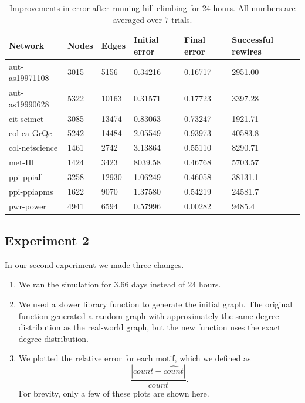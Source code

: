 \begin{table}[t]
\centering
\begin{tabular}{| l | l | l | | l | l | l |}
\hline
Network & Nodes & Edges & Initial error & Final error & Successful rewires\\ \hline
aut-as19971108 & 3015 & 5156 & 0.34216 & 0.16717 & 2951.00\\\hline
aut-as19990628 & 5322 & 10163 & 0.31571 & 0.17723 & 3397.28\\\hline
cit-scimet & 3085 & 13474 & 0.83063 & 0.73247 & 1921.71\\\hline
col-ca-GrQc & 5242 & 14484 & 2.05549 & 0.93973 & 40583.8\\\hline
col-netscience & 1461 & 2742 & 3.13864 & 0.55110 & 8290.71\\\hline
met-HI & 1424 & 3423 & 8039.58 & 0.46768 & 5703.57\\\hline
ppi-ppiall & 3258 & 12930 & 1.06249 & 0.46058 & 38131.1\\\hline
ppi-ppiapms & 1622 & 9070 & 1.37580 & 0.54219 & 24581.7\\\hline
pwr-power & 4941 & 6594 & 0.57996 & 0.00282 & 9485.4\\\hline
\end{tabular}
\caption{Improvements in error after running hill climbing for 24 hours.  All numbers are averaged over $7$ trials.}
\label{table:errors}
\end{table}

\subsection{Experiment 2}

In our second experiment we made three changes.

\begin{enumerate}
\item We ran the simulation for 3.66 days instead of 24 hours.
\item We used a slower library function to generate the initial graph.  
The original function generated a random graph with approximately 
the same degree distribution as the real-world graph, but the new 
function uses the exact degree distribution.
\item We plotted the relative error for each motif, which we defined as
$$\frac{|count - \widehat{count}|}{count}.$$  For brevity, only a
few of these plots are shown here.
\end{enumerate}

